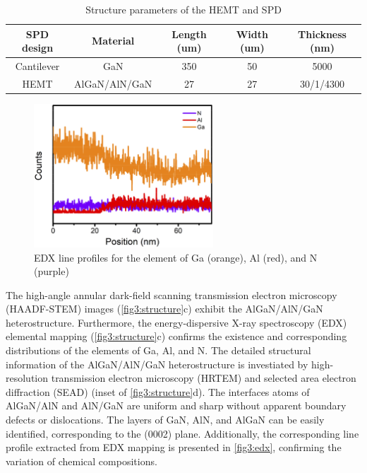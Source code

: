 \begin{table}[H]
\renewcommand\arraystretch{1.5}
\centering
\caption[Structure parameters of the HEMT and SPD]{Structure parameters of the HEMT and SPD}
\begin{tabular}{ccccc}
\hline \hline
SPD design  & Material      & Length (\unit{um}) & Width (\unit{um})& Thickness (\unit{nm}) \\ \hline \hline
Cantilever  & GaN           & 350    & 50    & 5000      \\
HEMT & AlGaN/AlN/GaN & 27     & 27    & 30/1/4300 \\ \hline \hline
\end{tabular}
\label{tab:3.1}
\end{table}

\begin{figure}[H] 
\centering    
\includegraphics[width=0.6\textwidth]{ch3_edx}
\caption[EDX line profiles for the element of Ga (orange), Al (red), and N (purple)]{EDX line profiles for the element of Ga (orange), Al (red), and N (purple)}
\label{fig3:edx}
\end{figure}

The high-angle annular dark-field scanning transmission electron microscopy (HAADF-STEM)  images (\autoref{fig3:structure}c) exhibit the AlGaN/AlN/GaN heterostructure. Furthermore, the energy-dispersive X-ray spectroscopy (EDX)  elemental mapping (\autoref{fig3:structure}c) confirms the existence and corresponding distributions of the elements of Ga, Al, and N. The detailed structural information of the AlGaN/AlN/GaN heterostructure  is investiated by high-resolution transmission electron microscopy (HRTEM) and selected area electron diffraction (SEAD) (inset of \autoref{fig3:structure}d). The interfaces atoms of AlGaN/AlN and AlN/GaN are uniform and sharp without apparent boundary defects or dislocations. The layers of GaN, AlN, and AlGaN can be easily identified, corresponding to the (0002) plane. Additionally, the corresponding line profile extracted from EDX mapping is presented in \autoref{fig3:edx}, confirming the variation of chemical compositions.


